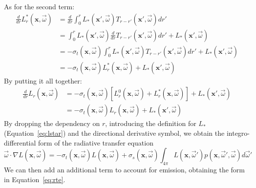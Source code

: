 As for the second term:
\begin{equation}
\begin{split}
\frac{d}{dr} L^*_r(\mathbf{x}, \vec{\omega}) &= \frac{d}{dr} \int_0^r L_*(\mathbf{x}', \vec{\omega}) T_{r-r'}(\mathbf{x}', \vec{\omega})  dr' \\
&= \int_0^r L_*(\mathbf{x}', \vec{\omega}) \frac{d}{dr} T_{r-r'}(\mathbf{x}', \vec{\omega})  dr' + L_*(\mathbf{x}', \vec{\omega})
 \\
 &= -\sigma_t(\mathbf{x}, \vec{\omega})  \int_0^r L_*(\mathbf{x}', \vec{\omega}) T_{r-r'}(\mathbf{x}', \vec{\omega})  dr' + L_*(\mathbf{x}', \vec{\omega}) \\
 &= -\sigma_t(\mathbf{x}, \vec{\omega}) L^*_r(\mathbf{x}, \vec{\omega}) + L_*(\mathbf{x}', \vec{\omega})
\end{split}
\end{equation}
By putting it all together:
\begin{equation}
\begin{split}
\frac{d}{dr} L_r(\mathbf{x}, \vec{\omega}) &= -\sigma_t(\mathbf{x}, \vec{\omega}) [L^0_r(\mathbf{x}, \vec{\omega}) + L^*_r(\mathbf{x}, \vec{\omega})] + L_*(\mathbf{x}', \vec{\omega}) \\
&=  -\sigma_t(\mathbf{x}, \vec{\omega}) L_r(\mathbf{x}, \vec{\omega}) +  L_*(\mathbf{x}', \vec{\omega}) 
\end{split}
\end{equation}
By dropping the dependency on $r$, introducing the definition for $L_*$ (Equation~\ref{eq:lstar}) and the directional derivative symbol, we obtain the integro-differential form of the radiative  transfer equation
\begin{equation*}\vec{\omega} \cdot \nabla L(\mathbf{x}, \vec{\omega}) = - \sigma_t(\mathbf{x}, \vec{\omega}) L(\mathbf{x}, \vec{\omega}) + \sigma_s(\mathbf{x}, \vec{\omega}) \int_{4\pi} L(\mathbf{x}, \vec{\omega}')  p(\mathbf{x}, \vec{\omega}', \vec{\omega}) d \vec{\omega}'\end{equation*}
We can then add an additional term to account for emission, obtaining the form in Equation~\ref{eq:rte}.
